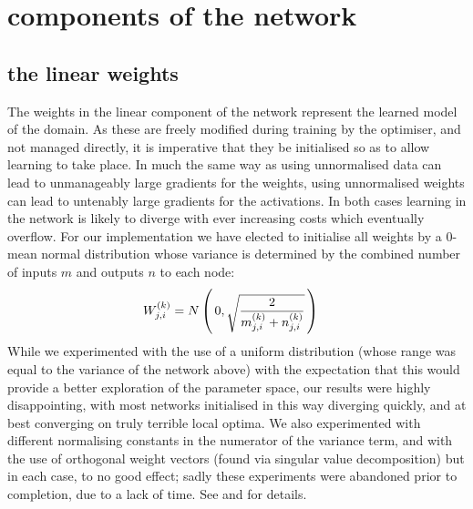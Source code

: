\documentclass[msc]{infthesis}
\newcommand{\weights}[2][]{W_{#1}^{(#2)}}
\newcommand{\of}[1]{\left(\,{#1}\,\right)}
\begin{document}
\section{components of the network}
\label{sec:classification:3}



\subsection{the linear weights}
\label{sec:classification:2-6}

The weights in the linear component of the network represent the learned model of the domain.  As
these are freely modified during training by the optimiser, and not managed directly, it is
imperative that they be initialised so as to allow learning to take place.  In much the same
way as using unnormalised data can lead to unmanageably large gradients for the weights,
using unnormalised weights can lead to untenably large gradients for the activations.  In both
cases learning in the network is likely to diverge with ever increasing costs which eventually
overflow.  For our implementation we have elected to initialise all weights by a 0-mean normal
distribution whose variance is determined by the combined number of inputs \(m\) and outputs \(n\)
to each node:
\begin{align}
  \label{eq:weight-initialisation}
  \weights[j,i]{k}
  &=
    N\of{ 0, { \sqrt{2 \over  m_{j,i}^{(k)} + n_{j,i}^{(k)}} } }
\end{align}
While we experimented with the use of a uniform distribution (whose range was equal to the
variance of the network above) with the expectation that this would
provide a better exploration of the parameter space, our results were highly disappointing, with
most networks initialised in this way diverging quickly, and at best converging on truly terrible
local optima.  We also experimented with different normalising constants in the numerator of the
variance term, and with the use of orthogonal weight vectors (found via singular value decomposition)
but in each case, to no good effect; sadly these experiments were abandoned prior to completion,
due to a lack of time.  See \cite{DBLP:journals/corr/SaxeMG13} and \cite{Glorot10understandingthe}
for details.


\end{document}
